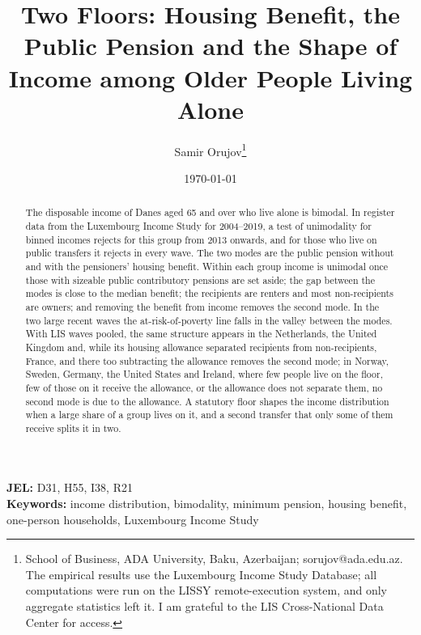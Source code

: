 \documentclass[12pt]{article}
\begin{document}
\doublespacing

\title{Two Floors: Housing Benefit, the Public Pension and the Shape of Income among Older People Living Alone}
\author{Samir Orujov\thanks{School of Business, ADA University, Baku, Azerbaijan; sorujov@ada.edu.az. The empirical results use the Luxembourg Income Study Database; all computations were run on the LISSY remote-execution system, and only aggregate statistics left it. I am grateful to the LIS Cross-National Data Center for access.}}
\date{\today}
\maketitle

\begin{abstract}
\noindent
The disposable income of Danes aged 65 and over who live alone is bimodal. In register data from the Luxembourg Income Study for 2004--2019, a test of unimodality for binned incomes rejects for this group from 2013 onwards, and for those who live on public transfers it rejects in every wave. The two modes are the public pension without and with the pensioners' housing benefit. Within each group income is unimodal once those with sizeable public contributory pensions are set aside; the gap between the modes is close to the median benefit; the recipients are renters and most non-recipients are owners; and removing the benefit from income removes the second mode. In the two large recent waves the at-risk-of-poverty line falls in the valley between the modes. With LIS waves pooled, the same structure appears in the Netherlands, the United Kingdom and, while its housing allowance separated recipients from non-recipients, France, and there too subtracting the allowance removes the second mode; in Norway, Sweden, Germany, the United States and Ireland, where few people live on the floor, few of those on it receive the allowance, or the allowance does not separate them, no second mode is due to the allowance. A statutory floor shapes the income distribution when a large share of a group lives on it, and a second transfer that only some of them receive splits it in two.
\end{abstract}

\noindent\textbf{JEL:} D31, H55, I38, R21\\
\textbf{Keywords:} income distribution, bimodality, minimum pension, housing benefit, one-person households, Luxembourg Income Study

\newpage








\newpage
\appendix

\end{document}
